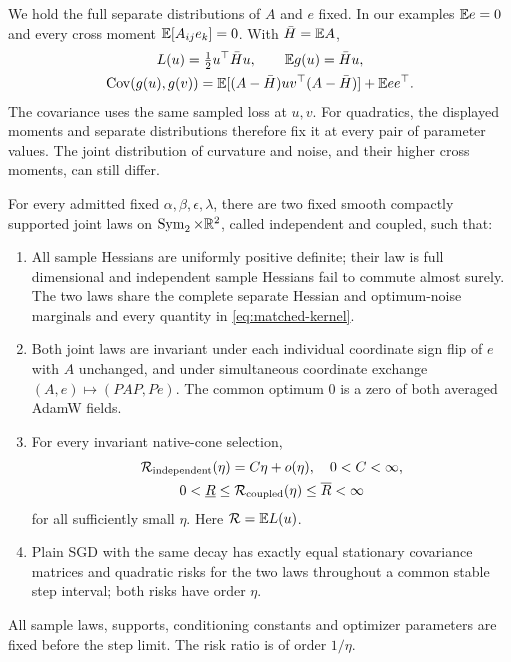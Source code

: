 We hold the full separate distributions of $A$ and $e$ fixed. In our examples
$\mathbb E e=0$ and every cross moment $\mathbb E[A_{ij}e_k]=0$. With $\bar H=\mathbb E A$,
\begin{equation}\label{eq:matched-kernel}
 \begin{gathered}
 L(u)=\tfrac12u^\top\bar H u,\qquad \mathbb E g(u)=\bar H u,\\
 \operatorname{Cov}(g(u),g(v))=\mathbb E[(A-\bar H)uv^\top(A-\bar H)]+\mathbb E ee^\top.
 \end{gathered}
\end{equation}
The covariance uses the same sampled loss at $u,v$. For quadratics, the
displayed moments and separate distributions therefore fix it at every pair
of parameter values. The joint distribution of curvature and noise, and
their higher cross moments, can still differ.

\begin{theorem}
\label{thm:main}
For every admitted fixed $\alpha,\beta,\epsilon,\lambda$, there are two
fixed smooth compactly supported joint laws on
$\operatorname{Sym}_2\times\mathbb R^2$, called independent and coupled, such that:
\begin{enumerate}
 \item All sample Hessians are uniformly positive definite; their law is
 full dimensional and independent sample Hessians fail to commute almost
 surely. The two laws share the complete separate Hessian and optimum-noise
 marginals and every quantity in \eqref{eq:matched-kernel}.
 \item Both joint laws are invariant under each individual coordinate
 sign flip of $e$ with $A$ unchanged, and under simultaneous coordinate
 exchange $(A,e)\mapsto(PAP,Pe)$. The common optimum $0$ is a zero of
 both averaged AdamW fields.
 \item For every invariant native-cone selection,
 \[
\begin{gathered}
  \mathcal R_{\rm independent}(\eta)=C\eta+o(\eta),\quad 0<C<\infty,
\\
   0<\underline R\leq\mathcal R_{\rm coupled}(\eta)\leq\overline R<\infty
\end{gathered}
 \]
 for all sufficiently small $\eta$. Here $\mathcal R=\mathbb E L(u)$.
 \item Plain SGD with the same decay has exactly equal stationary
 covariance matrices and quadratic risks for the two laws throughout a
 common stable step interval; both risks have order $\eta$.
\end{enumerate}
All sample laws, supports, conditioning constants and optimizer parameters
are fixed before the step limit. The risk ratio is of order $1/\eta$.
\end{theorem}

